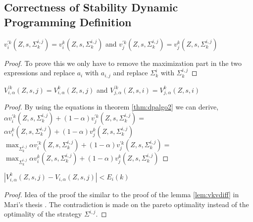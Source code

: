 \subsection{Correctness of Stability Dynamic Programming Definition }

\begin{theorem}
	\label{thm:dpalgo2}
	$v_i^{'k}(Z,s,\Sigma^{i,j}_k)=v_i^{k}(Z,s,\Sigma^{i,j}_k)$ and
	$v_j^{'k}(Z,s,\Sigma^{i,j}_k)=v_j^{k}(Z,s,\Sigma^{i,j}_k)$
\end{theorem}

\begin{proof}
	To prove this we only have to remove the maximization part in the two expressions and replace $a_i$ with $a_{i,j}$ and replace $\Sigma^i_k$ with $\Sigma^{i,j}_k$ 
\end{proof}


\begin{theorem}
	\label{thm:dpalgo2}
	$V_{i,\alpha}^{'k}(Z,s,j)=V_{i,\alpha}^{k}(Z,s,j)$ and
	$V_{j,\alpha}^{'k}(Z,s,i)=V_{j,\alpha}^{k}(Z,s,i)$
\end{theorem}

\begin{proof}
	By using the equations in theorem \ref{thm:dpalgo2} we can derive,\\
	$\alpha v_i^{'k}(Z,s,\Sigma^{i,j}_k) + (1-\alpha)v_j^{'k}(Z,s,\Sigma^{i,j}_k)=$
	$\alpha v_i^{k}(Z,s,\Sigma^{i,j}_k) + (1-\alpha)v_j^{k}(Z,s,\Sigma^{i,j}_k) $\\
	$\max_{\Sigma^{i,j}_k} \alpha v_i^{'k}(Z,s,\Sigma^{i,j}_k) + (1-\alpha)v_j^{'k}(Z,s,\Sigma^{i,j}_k)=$
	$\max_{\Sigma^{i,j}_k}\alpha v_i^{k}(Z,s,\Sigma^{i,j}_k) + (1-\alpha)v_j^{k}(Z,s,\Sigma^{i,j}_k) $
\end{proof}

\begin{lemma}
	\label{lem:paretoerror}
	$|V_{i,\alpha}^{k}(Z,s,j)-V_{i,\alpha}(Z,s,j)|<E_i(k)$
\end{lemma}

\begin{proof}
	Idea of the proof the similar to the proof of the lemma \ref{lem:vkvdiff} in Mari's thesis \cite{MariPhD}. The contradiction is made on the pareto optimality instead of the optimality of the strategy $\Sigma^{i,j}$.
\end{proof}